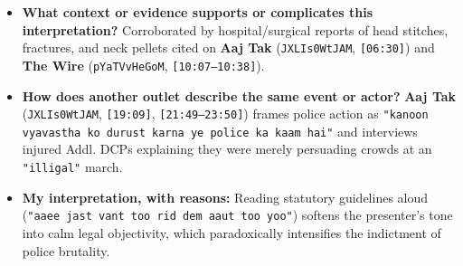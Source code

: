 \documentclass[10pt,a4paper]{article}
\begin{document}
\begin{itemize}[leftmargin=1.5em, itemsep=3pt, topsep=4pt]
  \item \textbf{What context or evidence supports or complicates this interpretation?} Corroborated by hospital/surgical reports of head stitches, fractures, and neck pellets cited on \textbf{Aaj Tak} (\texttt{JXLIs0WtJAM}, \texttt{[06:30]}) and \textbf{The Wire} (\texttt{pYaTVvHeGoM}, \texttt{[10:07--10:38]}).
  \item \textbf{How does another outlet describe the same event or actor?} \textbf{Aaj Tak} (\texttt{JXLIs0WtJAM}, \texttt{[19:09]}, \texttt{[21:49--23:50]}) frames police action as \texttt{"kanoon vyavastha ko durust karna ye police ka kaam hai"} and interviews injured Addl. DCPs explaining they were merely persuading crowds at an \texttt{"illigal"} march.
  \item \textbf{My interpretation, with reasons:} Reading statutory guidelines aloud (\texttt{"aaee jast vant too rid dem aaut too yoo"}) softens the presenter's tone into calm legal objectivity, which paradoxically intensifies the indictment of police brutality.
\end{itemize}
\end{document}
